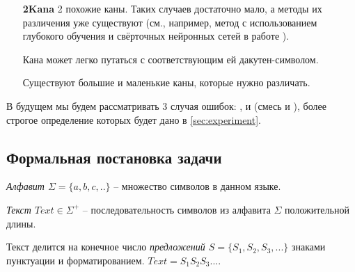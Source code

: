 \begin{itemize}
	\item[\textbf{2Kana}] 2 похожие каны. Таких случаев достаточно мало, а методы их различения уже существуют (см., например, метод с использованием глубокого обучения и свёрточных нейронных сетей в работе \cite{tsai:dcnn}).
	\begin{figure}[H]
	\end{figure}

	\item[\KG] Кана может легко путаться с соответствующим ей дакутен-символом.
	\begin{figure}[H]
	\end{figure}

	\item[\BS] Существуют большие и маленькие каны, которые нужно различать.
	\begin{figure}[H]
	\end{figure}
	
\end{itemize}

В будущем мы будем рассматривать 3 случая ошибок: \textbf{\KG}, \textbf{\BS} и \textbf{\MX} (смесь \textbf{\KG} и  \textbf{\BS} ), более строгое определение которых будет дано в \cref{sec:experiment}.

\subsection{ Формальная постановка задачи }

\begin{definition}
	{\textit{Алфавит $\Sigma = \{ a, b, c, .. \}$}} -- множество символов в данном языке.
\end{definition}

\begin{definition}
	{\textit{Текст $Text \in \Sigma^+$}} -- последовательность символов из алфавита $\Sigma$ положительной длины.
\end{definition}

\begin{definition}
	Текст делится на конечное число {\textit{предложений $S = \{ S_1, S_2, S_3, ... \}$}} знаками пунктуации и форматированием. $Text = S_1S_2S_3...$.
\end{definition}

